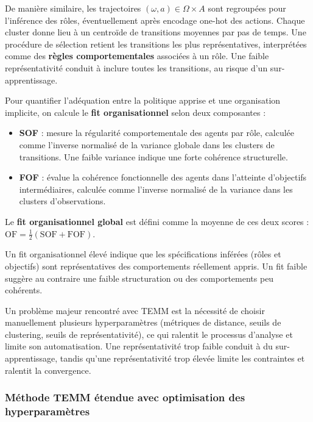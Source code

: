 De manière similaire, les trajectoires $(\omega, a) \in \Omega \times A$ sont regroupées pour l'inférence des rôles, éventuellement après encodage one-hot des actions. Chaque cluster donne lieu à un centroïde de transitions moyennes par pas de temps. Une procédure de sélection retient les transitions les plus représentatives, interprétées comme des \textbf{règles comportementales} associées à un rôle. Une faible représentativité conduit à inclure toutes les transitions, au risque d'un sur-apprentissage.

Pour quantifier l'adéquation entre la politique apprise et une organisation implicite, on calcule le \textbf{fit organisationnel} selon deux composantes :
\begin{itemize}
    \item \textbf{\ac{SOF}} : mesure la régularité comportementale des agents par rôle, calculée comme l'inverse normalisé de la variance globale dans les clusters de transitions. Une faible variance indique une forte cohérence structurelle.
    \item \textbf{\ac{FOF}} : évalue la cohérence fonctionnelle des agents dans l'atteinte d'objectifs intermédiaires, calculée comme l'inverse normalisé de la variance dans les clusters d'observations.
\end{itemize}

\noindent Le \textbf{fit organisationnel global} est défini comme la moyenne de ces deux scores : $\text{OF} = \frac{1}{2} \left( \text{SOF} + \text{FOF} \right)$.

Un fit organisationnel élevé indique que les spécifications inférées (rôles et objectifs) sont représentatives des comportements réellement appris. Un fit faible suggère au contraire une faible structuration ou des comportements peu cohérents.

Un problème majeur rencontré avec \ac{TEMM} est la nécessité de choisir manuellement plusieurs hyperparamètres (métriques de distance, seuils de clustering, seuils de représentativité), ce qui ralentit le processus d'analyse et limite son automatisation. Une représentativité trop faible conduit à du sur-apprentissage, tandis qu'une représentativité trop élevée limite les contraintes et ralentit la convergence.

\subsubsection{Méthode TEMM étendue avec optimisation des hyperparamètres}


